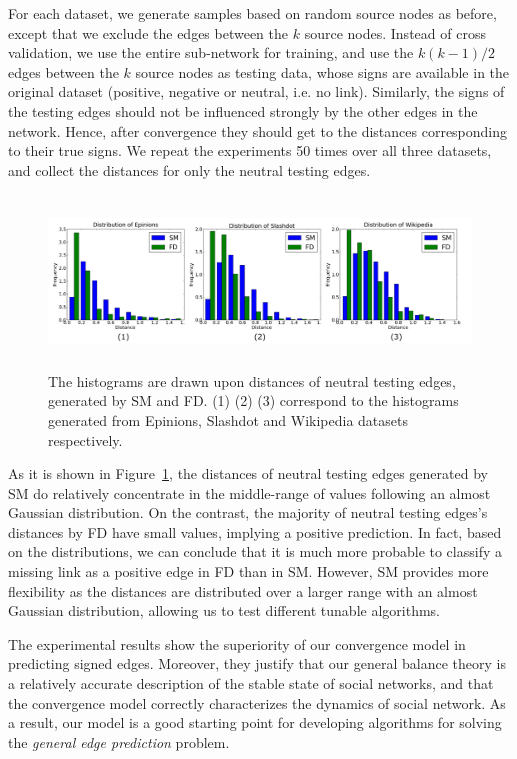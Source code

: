 For each dataset, we generate samples based on random source nodes as
before, except that we exclude the edges between the $k$ source
nodes. Instead of cross validation, we use the entire sub-network for
training, and use the $k(k-1)/2$ edges between the $k$ source nodes as
testing data, whose signs are available in the original dataset
(positive, negative or neutral, i.e. no link). Similarly, the signs of
the testing edges should not be influenced strongly by the other edges
in the network. Hence, after convergence they should get to the
distances corresponding to their true signs. We repeat the experiments
50 times over all three datasets, and collect the distances for only
the neutral testing edges.
\begin{figure}[th]
\centering
\includegraphics[height=1.8in]{Figs/hist1.pdf}
\caption{\label{hist}The histograms are drawn upon distances of
  neutral testing edges, generated by SM and FD. (1) (2) (3)
  correspond to the histograms generated from Epinions, Slashdot and
  Wikipedia datasets respectively.}
\end{figure}

As it is shown in Figure~\ref{hist}, the distances of neutral testing
edges generated by SM do relatively concentrate in the middle-range of
values following an almost Gaussian distribution. On the contrast, the
majority of neutral testing edges's distances by FD have small values,
implying a positive prediction. In fact, based on the distributions,
we can conclude that it is much more probable to classify a missing
link as a positive edge in FD than in SM.  However, SM provides more
flexibility as the distances are distributed over a larger range with
an almost Gaussian distribution, allowing us to test different tunable
algorithms.

The experimental results show the superiority of our convergence model
in predicting signed edges. Moreover, they justify that our general
balance theory is a relatively accurate description of the stable
state of social networks, and that the convergence model correctly
characterizes the dynamics of social network. As a result, our model
is a good starting point for developing algorithms for solving the
{\it general edge prediction} problem.

